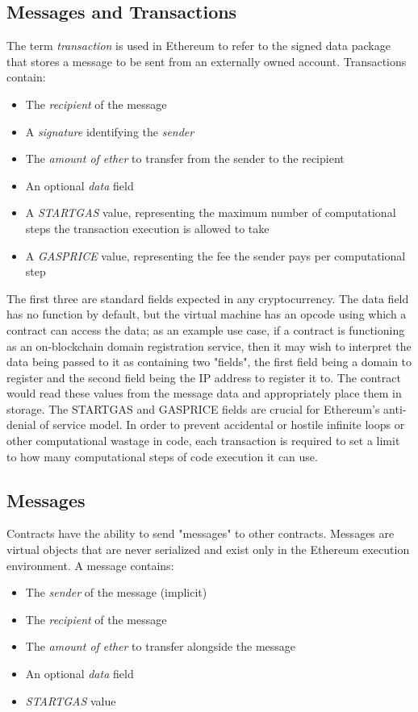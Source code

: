 \subsection{Messages and Transactions}
The term \textit{transaction} is used in Ethereum to refer to the signed data package that stores a message to be sent from an externally owned account. Transactions contain:
\begin{itemize}
    \item The \textit{recipient} of the message
    \item A \textit{signature} identifying the \textit{sender}
    \item The \textit{amount of ether} to transfer from the sender to the recipient
    \item An optional \textit{data} field
    \item A \textit{STARTGAS} value, representing the maximum number of computational steps the transaction execution is allowed to take
    \item A \textit{GASPRICE} value, representing the fee the sender pays per computational step
\end{itemize}

The first three are standard fields expected in any cryptocurrency. The data field has no function by default, but the virtual machine has an opcode using which a contract can access the data; as an example use case, if a contract is functioning as an on-blockchain domain registration service, then it may wish to interpret the data being passed to it as containing two "fields", the first field being a domain to register and the second field being the IP address to register it to. The contract would read these values from the message data and appropriately place them in storage. \newline
The STARTGAS and GASPRICE fields are crucial for Ethereum's anti-denial of service model. In order to prevent accidental or hostile infinite loops or other computational wastage in code, each transaction is required to set a limit to how many computational steps of code execution it can use. 

\subsection{Messages}
Contracts have the ability to send "messages" to other contracts. Messages are virtual objects that are never serialized and exist only in the Ethereum execution environment. A message contains:
\begin{itemize}
    \item The \textit{sender} of the message (implicit)
    \item The \textit{recipient} of the message
    \item The \textit{amount of ether} to transfer alongside the message
    \item An optional \textit{data} field
    \item \textit{STARTGAS} value
\end{itemize}

